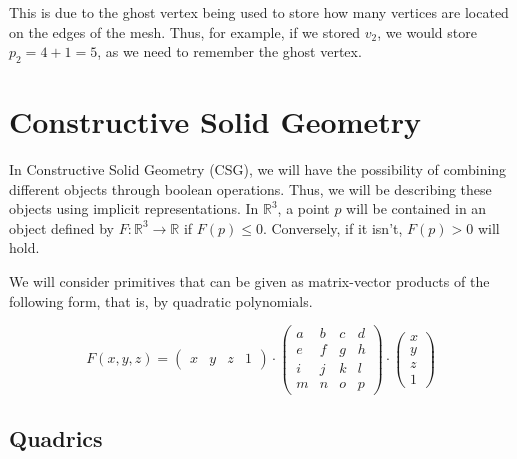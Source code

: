 \documentclass{panikzettel}
\begin{document}
This is due to the ghost vertex being used to store how many vertices are located on the edges of the mesh. Thus, for example, if we stored $v_2$, we would store $p_2 = 4 + 1 = 5$, as we need to remember the ghost vertex.

\section{Constructive Solid Geometry}

In Constructive Solid Geometry (CSG), we will have the possibility of combining different objects through boolean operations. Thus, we will be describing these objects using implicit representations. In $\mathbb{R}^3$, a point $p$ will be contained in an object defined by $F: \mathbb{R}^3 \to \mathbb{R}$ if $F(p) \le 0$. Conversely, if it isn't, $F(p) > 0$ will hold.

We will consider primitives that can be given as matrix-vector products of the following form, that is, by quadratic polynomials.

$$F(x,y,z) = \begin{pmatrix} x & y & z & 1 \end{pmatrix} \cdot
\begin{pmatrix}
a & b & c & d \\
e & f & g & h \\
i & j & k & l \\
m & n & o & p
\end{pmatrix} \cdot
\begin{pmatrix} x \\ y \\ z \\ 1 \end{pmatrix}$$

\subsection{Quadrics}
\end{document}
